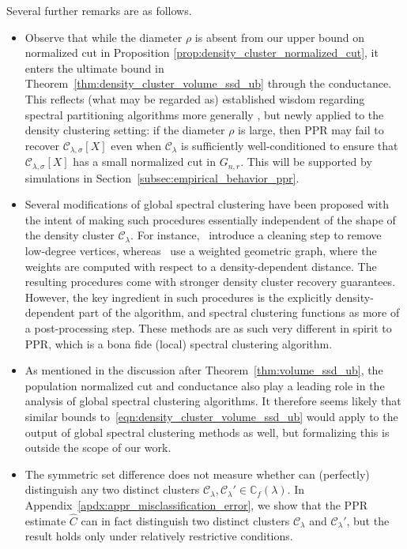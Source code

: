 \documentclass[twoside,11pt]{article}
\newcommand{\1}{\mathbf{1}}
\newcommand{\mc}[1]{\mathcal{#1}}
\newcommand{\mbb}[1]{\mathbb{#1}}
\newcommand{\wh}[1]{\widehat{#1}}
\begin{document}
Several further remarks are as follows.
\begin{itemize}
	\item Observe that while the diameter $\rho$ is absent from our upper bound on normalized cut in Proposition \ref{prop:density_cluster_normalized_cut}, it enters the ultimate bound in Theorem~\ref{thm:density_cluster_volume_ssd_ub} through the conductance. This reflects (what may be regarded as) established wisdom regarding spectral partitioning algorithms more generally \citep{guattery1995, hein2010}, but newly applied to the density clustering setting: if the diameter $\rho$ is large, then PPR	may fail to recover $\mc{C}_{\lambda,\sigma}[X]$ even when $\mc{C}_{\lambda}$ is sufficiently well-conditioned to ensure that $\mc{C}_{\lambda,\sigma}[X]$ has a small normalized cut in $G_{n,r}$. This will be supported by simulations in Section~\ref{subsec:empirical_behavior_ppr}.   
	\item Several modifications of global spectral clustering have been proposed with the intent of making such procedures essentially independent of the shape of the density cluster $\mc{C}_{\lambda}$. For instance,~\citet{arias-castro2009,pelletier2011} introduce a cleaning step to remove low-degree vertices, whereas~\cite{little2020} use a weighted geometric graph, where the weights are computed with respect to a density-dependent distance. The resulting procedures come with stronger density cluster recovery guarantees. However, the key ingredient in such procedures is the explicitly density-dependent part of the algorithm, and spectral clustering functions as more of a post-processing step. These methods are as such very different in spirit to PPR, which is a bona fide (local) spectral clustering algorithm. 
	\item As mentioned in the discussion after Theorem~\ref{thm:volume_ssd_ub}, the population normalized cut and conductance also play a leading role in the analysis of global spectral clustering algorithms. It therefore seems likely that similar bounds to~\eqref{eqn:density_cluster_volume_ssd_ub} would apply to the output of global spectral clustering methods as well, but formalizing this is outside the scope of our work.
	\item The symmetric set difference does not measure whether \smash{$\wh{C}$} can (perfectly) distinguish any two distinct clusters $\mc{C}_{\lambda},\mc{C}_{\lambda}' \in \mbb{C}_f(\lambda)$. In Appendix~\ref{apdx:appr_misclassification_error}, we show that the PPR estimate $\wh{C}$ can in fact distinguish two distinct clusters $\mc{C}_{\lambda}$ and $\mc{C}_{\lambda}'$, but the result holds only under relatively restrictive conditions.
\end{itemize}
\end{document}
